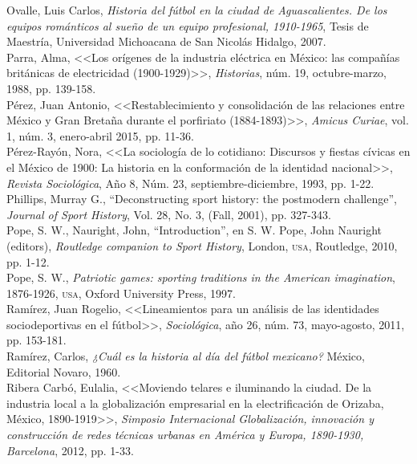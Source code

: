 \documentclass[11pt,a5paper,twoside]{book} %
\begin{document}
\begin{hangparas}{1cm}{1}
\noindent Ovalle, Luis Carlos, \emph{Historia del fútbol en la ciudad de Aguascalientes. De los equipos románticos al sueño de un equipo profesional, 1910-1965}, Tesis de Maestría, Universidad Michoacana de San Nicolás Hidalgo, 2007. \\

\noindent Parra, Alma, <<Los orígenes de la industria eléctrica en México: las compañías británicas de
electricidad (1900-1929)>>, \emph{Historias}, núm. 19, octubre-marzo, 1988, pp. 139-158. \\

\noindent Pérez, Juan Antonio, <<Restablecimiento y consolidación de las relaciones entre México y Gran Bretaña durante el porfiriato (1884-1893)>>, \emph{Amicus Curiae}, vol. 1, núm. 3, enero-abril 2015, pp. 11-36. \\

\noindent Pérez-Rayón, Nora, <<La sociología de lo cotidiano: Discursos y fiestas cívicas en el México de 1900: La historia en la conformación de la identidad nacional>>, \emph{Revista Sociológica}, Año 8, Núm. 23, septiembre-diciembre, 1993, pp. 1-22. \\

\noindent Phillips, Murray G., “Deconstructing sport history: the postmodern challenge”, \emph{Journal of Sport History}, Vol. 28, No. 3, (Fall, 2001), pp. 327-343. \\

\noindent Pope, S. W., Nauright, John, “Introduction”, en S. W. Pope, John Nauright (editors),
\emph{Routledge companion to Sport History}, London, \textsc{usa}, Routledge, 2010, pp. 1-12. \\

\noindent Pope, S. W., \emph{Patriotic games: sporting traditions in the American imagination}, 1876-1926, \textsc{usa}, Oxford University Press, 1997. \\

\noindent Ramírez, Juan Rogelio, <<Lineamientos para un análisis de las identidades sociodeportivas en el fútbol>>, \emph{Sociológica}, año 26, núm. 73, mayo-agosto, 2011, pp. 153-181. \\

\noindent Ramírez, Carlos, \emph{¿Cuál es la historia al día del fútbol mexicano?} México, Editorial Novaro, 1960. \\

\noindent Ribera Carbó, Eulalia, <<Moviendo telares e iluminando la ciudad. De la industria local a la globalización empresarial en la electrificación de Orizaba, México, 1890-1919>>, \emph{Simposio Internacional Globalización, innovación y construcción de redes técnicas urbanas en América y Europa, 1890-1930, Barcelona}, 2012, pp. 1-33. \\


\end{hangparas}
\end{document}
